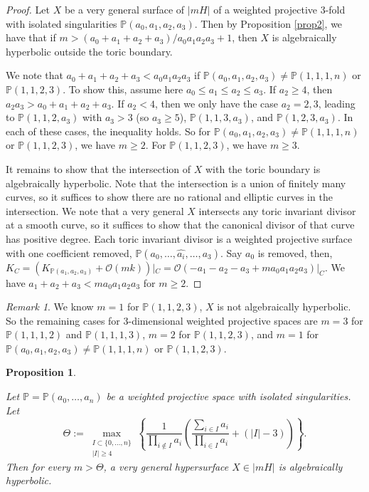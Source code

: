 \documentclass{amsart}
\newtheorem{proposition}[theorem]{Proposition}
\theoremstyle{definition}
\theoremstyle{remark}
\newtheorem{remark}[theorem]{Remark}
\begin{document}
\begin{proof}
    Let $X$ be a very general surface of $|mH|$ of a weighted projective 3-fold with isolated singularities $\mathbb P(a_0,a_1,a_2,a_3)$. Then by Proposition \ref{prop2}, we have that if $m > (a_0 + a_1+a_2 + a_3)/a_0a_1a_2 a_3 + 1$, then $X$ is algebraically hyperbolic outside the toric boundary.

    We note that $a_0+a_1+a_2+a_3 < a_0a_1a_2a_3$ if $\mathbb{P}(a_0, a_1, a_2, a_3) \neq \mathbb{P}(1, 1, 1, n)$ or $\mathbb{P}(1, 1, 2, 3)$. To show this, assume here $a_0 \leq a_1 \leq a_2 \leq a_3$. If $a_2 \geq 4$, then $a_2a_3 > a_0+a_1+a_2+a_3$. If $a_2 < 4$, then we only have the case $a_2 = 2,3$, leading to $\mathbb{P}(1,1,2,a_3)$ with $a_3>3$ (so $a_3 \geq 5$), $\mathbb{P}(1,1,3,a_3)$, and $\mathbb{P}(1,2,3,a_3)$. In each of these cases, the inequality holds. So for $\mathbb{P}(a_0, a_1, a_2, a_3) \neq \mathbb{P}(1, 1, 1, n)$ or $\mathbb{P}(1, 1, 2, 3)$, we have $m \geq 2$. For $\mathbb{P}(1,1,2,3)$, we have $m \geq 3$.

    It remains to show that the intersection of $X$ with the toric boundary is algebraically hyperbolic. Note that the intersection is a union of finitely many curves, so it suffices to show there are no rational and elliptic curves in the intersection. We note that a very general $X$ intersects any toric invariant divisor at a smooth curve, so it suffices to show that the canonical divisor of that curve has positive degree. Each toric invariant divisor is a weighted projective surface with one coefficient removed, $\mathbb{P}(a_0,\dots,\widehat{a_i},\dots,a_3)$. Say $a_0$ is removed, then, $K_C = (K_{\mathbb{P}(a_1,a_2,a_3)} + \mathcal O(mk))|_C =\mathcal O(-a_1-a_2-a_3 + m a_0a_1a_2a_3)|_C$.  We have $a_1+a_2+a_3 < m a_0a_1a_2a_3$ for $m \geq 2$.
\end{proof}
\begin{remark}
We know $m=1$ for $\mathbb P(1,1,2,3)$, $X$ is not algebraically hyperbolic. So the remaining cases for 3-dimensional weighted projective spaces are $m = 3$ for $\mathbb P(1,1,1,2)$ and $\mathbb P(1,1,1,3)$, $m=2$ for $\mathbb P(1,1,2,3)$, and $m=1$ for $\mathbb P(a_0,a_1,a_2,a_3)\neq \mathbb P(1,1,1,n) \text{ or } \mathbb P(1,1,2,3)$.
\end{remark}

\begin{proposition}\label{prop4}
  
Let $\mathbb{P} = \mathbb{P}(a_0,\dots,a_n)$ be a weighted projective space with isolated singularities. Let
\[
\Theta := \max_{\substack{I \subset \{0,\dots,n\} \\ |I|\ge 4}} \left\{\frac1{\prod_{i\notin I}a_i} \left( \frac{\sum_{i \in I} a_i}{\prod_{i\in I} a_i} + (|I|-3) \right)\right\}.
\]
Then for every $m > \Theta$, a very general hypersurface $X \in |mH|$ is algebraically hyperbolic.
\end{proposition}
\end{document}
